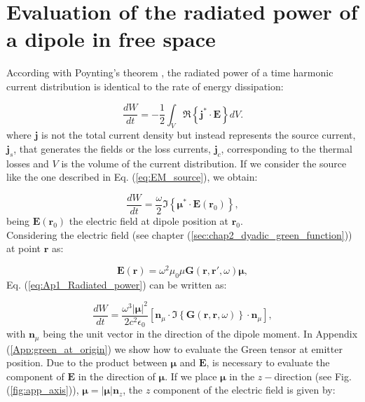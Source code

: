 \section{Evaluation of the radiated power of a dipole in free space \label{App:eval_green_source}}

According with Poynting's theorem \cite{Jackson_CE}, the radiated power of a time harmonic current distribution is identical to the rate of energy dissipation:

\begin{equation}
\frac{dW}{dt}=-\frac{1}{2}\int_V^{} \Re\left\{\mathbf{j}^{*}\cdot\mathbf{E}\right\} dV.
\end{equation}
where $\mathbf{j}$ is not the total current density but instead represents the source current,  $\mathbf{j}_{s}$, that generates the fields or the loss currents,  $\mathbf{j}_{c}$, corresponding to the thermal losses and $V$ is the volume of the current distribution. If we consider the source like the one described in Eq. (\ref{eq:EM_source}), we obtain:


\begin{equation}
\frac{dW}{dt}=\frac{\omega}{2} \Im\left\{\boldsymbol{\mu}^{*}\cdot\mathbf{E}\left(\mathbf{r}_{0}\right)\right\},\label{eq:Ap1_Radiated_power}
\end{equation}
being $\mathbf{E}\left(\mathbf{r}_{0}\right)$ the electric field at dipole position at $\mathbf{r}_0$.\\
Considering the electric field (see chapter (\ref{sec:chap2_dyadic_green_function})) at point $\mathbf{r}$ as:

\begin{equation}
\mathbf{E}\left(\mathbf{r}\right) = \omega^2 \mu_{0} \mu \mathbf{G}\left(\mathbf{r},\mathbf{r}',\omega\right)\boldsymbol{\mu},
\end{equation}
Eq. (\ref{eq:Ap1_Radiated_power}) can be written as:

\begin{equation}
\frac{dW}{dt}=\frac{\omega^{3}\left|\boldsymbol{\mu}\right|^{2}}{2c^{2}\epsilon_{0}}\left[\mathbf{n}_{\mu}\cdot\Im\left\{ \mathbf{G}\left(\mathbf{r},\mathbf{r},\omega\right)\right\} \cdot\mathbf{n}_{\mu}\right],
\end{equation}
with $\mathbf{n}_{\mu}$ being the unit vector in the direction of the dipole moment. In Appendix (\ref{App:green_at_origin}) we show  how to evaluate the Green tensor at emitter position. Due to the product between $\boldsymbol{\mu}$ and $\mathbf{E}$, is necessary to evaluate the component of $\mathbf{E}$ in the direction of $\boldsymbol{\mu}$. If we place $\boldsymbol{\mu}$ in the $z-$direction (see Fig. (\ref{fig:app_axis})), $\boldsymbol{\mu} = \left|\boldsymbol{\mu}\right|\mathbf{n}_{z}$, the $z$ component of the electric field is given by:

